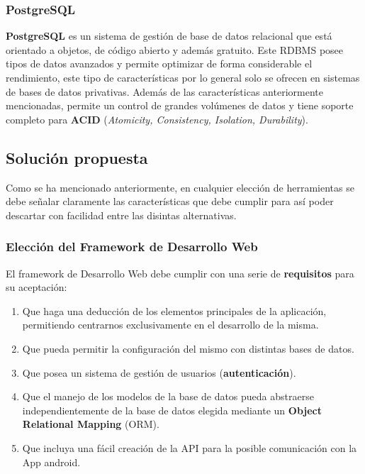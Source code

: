     \subsubsection{PostgreSQL}
    \textbf{PostgreSQL} es un sistema de gestión de base de datos relacional que está
    orientado a objetos, de código abierto y además gratuito. Este RDBMS posee tipos de
    datos avanzados y permite optimizar de forma considerable el rendimiento, este tipo de
    características por lo general solo se ofrecen en sistemas de bases de datos privativas.
    Además de las características anteriormente mencionadas, permite un control de grandes
    volúmenes de datos y tiene soporte completo para \textbf{ACID} (\textit{Atomicity,
    Consistency, Isolation, Durability}).

\subsection{Solución propuesta}
Como se ha mencionado anteriormente, en cualquier elección de herramientas se debe señalar
claramente las características que debe cumplir para así poder descartar con facilidad
entre las disintas alternativas.

    \subsubsection{Elección del Framework de Desarrollo Web}
    El framework de Desarrollo Web debe cumplir con una serie de \textbf{requisitos} para
    su aceptación:

        \begin{enumerate}
            \item Que haga una deducción de los elementos principales de la aplicación,
            permitiendo centrarnos exclusivamente en el desarrollo de la misma.
            \item Que pueda permitir la configuración del mismo con distintas bases de
            datos.
            \item Que posea un sistema de gestión de usuarios (\textbf{autenticación}).
            \item Que el manejo de los modelos de la base de datos pueda abstraerse
            independientemente de la base de datos elegida mediante un \textbf{Object
            Relational Mapping} (ORM).
            \item Que incluya una fácil creación de la API para la posible comunicación
            con la App android.
        \end{enumerate}

